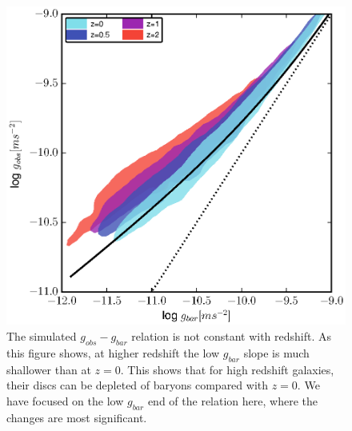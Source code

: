 \begin{figure}
    \includegraphics[width=\textwidth]{figures4/redshift_evolution.eps}
    \caption[Redshift evolution of acceleration relation]{The  simulated
    $g_{obs}-g_{bar}$ relation is not constant with redshift.  As this figure
    shows, at higher redshift the low $g_{bar}$ slope is much shallower than at
    $z=0$.  This shows that for high redshift galaxies, their discs can be
    depleted of baryons compared with $z=0$.  We have focused on the low
    $g_{bar}$ end of the relation here, where the changes are most significant.}
    \label{redshift_evolution}
\end{figure}
